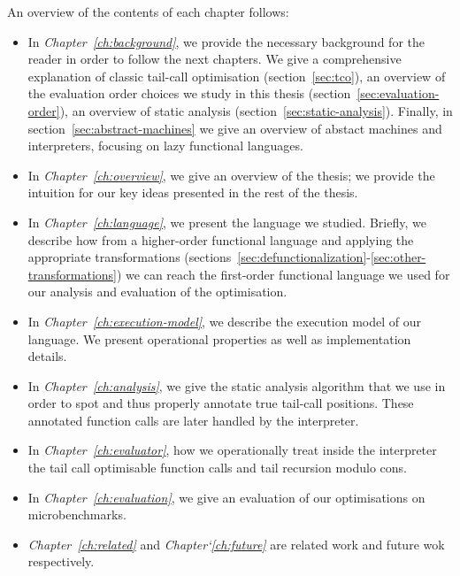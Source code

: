 \documentclass[diploma]{softlab-thesis}
\begin{document}
An overview of the contents of each chapter follows:
\begin{itemize}
  \item In \textit{Chapter~\ref{ch:background}}, we provide the necessary background for the reader in 
        order to follow the next chapters. We give a comprehensive explanation of classic 
        tail-call optimisation (section~\ref{sec:tco}), an overview of the evaluation order choices we study 
        in this thesis (section~\ref{sec:evaluation-order}), an overview of static analysis (section~\ref{sec:static-analysis}). Finally, 
        in section~\ref{sec:abstract-machines} we give an overview of abstact machines and interpreters, focusing on 
        lazy functional languages.

  \item In \textit{Chapter~\ref{ch:overview}}, we give an overview of the thesis; we provide the intuition 
        for our key ideas presented in the rest of the thesis.

  \item In \textit{Chapter~\ref{ch:language}}, we present the language we studied. Briefly, we describe 
        how from a higher-order functional language and applying the appropriate 
        transformations (sections~\ref{sec:defunctionalization}-\ref{sec:other-transformations}) we can reach the first-order functional 
        language we used for our analysis and evaluation of the optimisation.

  \item In \textit{Chapter~\ref{ch:execution-model}}, we describe the execution model of our language. We present operational 
        properties as well as implementation details.

  \item In \textit{Chapter~\ref{ch:analysis}}, we give the static analysis algorithm that we use in order to spot 
        and thus properly annotate true tail-call positions. These annotated function calls 
        are later handled by the interpreter.

  \item In \textit{Chapter~\ref{ch:evaluator}}, how we operationally treat inside the interpreter the 
        tail call optimisable function calls and tail recursion modulo cons.

  \item In \textit{Chapter~\ref{ch:evaluation}}, we give an evaluation of our optimisations on microbenchmarks.

  \item \textit{Chapter~\ref{ch:related}} and \textit{Chapter`\ref{ch:future}} are related work and future wok respectively.

\end{itemize}
\end{document}
